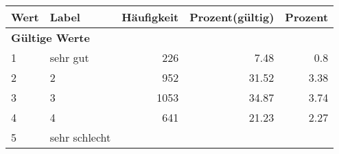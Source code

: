      \begin{longtable}{lXrrr}
     \toprule
     \textbf{Wert} & \textbf{Label} & \textbf{Häufigkeit} & \textbf{Prozent(gültig)} & \textbf{Prozent} \\
     \endhead
     \midrule
     \multicolumn{5}{l}{\textbf{Gültige Werte}}\\

     1 &
     \multicolumn{1}{X}{ sehr gut   } &


       \num{226} &
       \num[round-mode=places,round-precision=2]{7,48} &
         \num[round-mode=places,round-precision=2]{0,8} \\

     2 &
     \multicolumn{1}{X}{ 2   } &


       \num{952} &
       \num[round-mode=places,round-precision=2]{31,52} &
         \num[round-mode=places,round-precision=2]{3,38} \\

     3 &
     \multicolumn{1}{X}{ 3   } &


       \num{1053} &
       \num[round-mode=places,round-precision=2]{34,87} &
         \num[round-mode=places,round-precision=2]{3,74} \\

     4 &
     \multicolumn{1}{X}{ 4   } &


       \num{641} &
       \num[round-mode=places,round-precision=2]{21,23} &
         \num[round-mode=places,round-precision=2]{2,27} \\

     5 &
     \multicolumn{1}{X}{ sehr schlecht   } &



\end{longtable}
